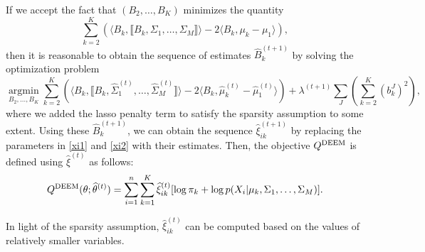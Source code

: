\documentclass[11pt]{article}
\newcommand{\br}[1]{\llbracket #1 \rrbracket}
\newcommand{\amin}{\operatorname*{argmin}}
\newcommand{\wh}{\widehat}
\begin{document}
If we accept the fact that $(B_2,\dots, B_K)$ minimizes the quantity
\begin{equation*}
  \sum_{k=2}^K  \left( \langle B_k , \br{B_k, \Sigma_1 , \dots , \Sigma_M} \rangle - 2 \langle B_k , \mu_k - \mu_1 \rangle \right),
\end{equation*}
then it is reasonable to obtain the sequence of estimates $\wh B_k^{(t+1)}$ by solving the optimization problem
\begin{equation*}
  \amin_{B_2,\dots, B_K}\sum_{k=2}^K  \left( \langle B_k , \br{B_k, \wh\Sigma_1^{(t)} , \dots , \wh \Sigma_M^{(t)}} \rangle - 2 \langle B_k , \wh \mu_k ^{(t)}- \wh \mu_1^{(t)} \rangle \right) + \lambda^{(t+1)}\sum_J \left( \sum_{k=2}^K (b_k^J)^2 \right),
\end{equation*}
where we added the lasso penalty term to satisfy the sparsity assumption to some extent.
Using these $\wh B_k^{(t+1)}$, we can obtain the sequence $\wh\xi^{(t+1)}_{ik}$ by replacing the parameters in \eqref{xi1} and \eqref{xi2} with their estimates.
Then, the objective $Q^{\textup{DEEM}}$ is defined using $\wh\xi^{(t)}$ as follows:
\begin{equation*}
  Q^{\textup{DEEM}}(\theta; \wh\theta^{(t)}) = \sum_{i=1}^n \sum_{k=1}^K \wh \xi^{(t)}_{ik}[\log \pi_k +\log p(X_i| \mu_k , \Sigma_1, \dots , \Sigma_M)].
  \end{equation*}

In light of the sparsity assumption, $\wh\xi^{(t)}_{ik}$ can be computed based on the values of relatively smaller variables.
\end{document}
